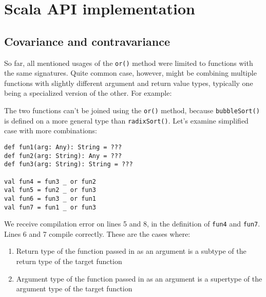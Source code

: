\section{Scala API implementation}







\subsection{Covariance and contravariance}
So far, all mentioned usages of the \lstinline|or()| method were limited to functions with the same signatures. Quite common case, however, might be combining multiple functions with slightly different argument and return value types, typically one being a specialized version of the other. For example:


The two functions can't be joined using the \lstinline|or()| method, because \lstinline|bubbleSort()| is defined on a more general type than \lstinline|radixSort()|. Let's examine simplified case with more combinations:

\lstset{language=Scala}
\begin{lstlisting}
def fun1(arg: Any): String = ???
def fun2(arg: String): Any = ???
def fun3(arg: String): String = ???

val fun4 = fun3 _ or fun2
val fun5 = fun2 _ or fun3
val fun6 = fun3 _ or fun1
val fun7 = fun1 _ or fun3
\end{lstlisting}

We receive compilation error on lines 5 and 8, in the definition of \lstinline|fun4| and \lstinline|fun7|. Lines 6 and 7 compile correctly. These are the cases where:

\begin{enumerate}
	\item Return type of the function passed in as an argument is a subtype of the return type of the target function
	\item Argument type of the function passed in as an argument is a supertype of the argument type of the target function
\end{enumerate}

